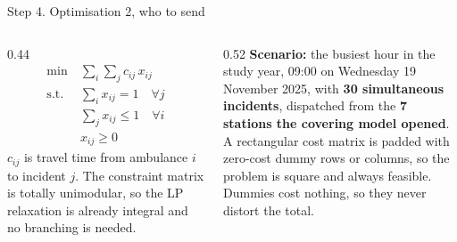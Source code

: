 \documentclass[aspectratio=169,10pt]{beamer}
\begin{document}
\begin{frame}{Step 4. Optimisation 2, who to send}
  \vspace{0.4em}
  \begin{columns}[T,onlytextwidth]
    \begin{column}{0.44\textwidth}
      \begin{align*}
        \min\ & \textstyle\sum_i \sum_j c_{ij}\, x_{ij} \\
        \text{s.t.}\ & \textstyle\sum_i x_{ij} = 1 \quad \forall j \\
                     & \textstyle\sum_j x_{ij} \leq 1 \quad \forall i \\
                     & x_{ij} \geq 0
      \end{align*}
      {\footnotesize\color{inks}$c_{ij}$ is travel time from ambulance $i$ to
      incident $j$. The constraint matrix is totally unimodular, so the LP
      relaxation is already integral and no branching is needed.}
    \end{column}
    \begin{column}{0.52\textwidth}
      {\color{inks}\textbf{Scenario:} the busiest hour in the study year,
      09:00 on Wednesday 19 November 2025, with \textbf{30 simultaneous
      incidents}, dispatched from the \textbf{7 stations the covering model
      opened}.}\\[0.8em]
      {\footnotesize\color{inks}A rectangular cost matrix is padded with
      zero-cost dummy rows or columns, so the problem is square and always
      feasible. Dummies cost nothing, so they never distort the total.}
    \end{column}
  \end{columns}
\end{frame}
\end{document}
